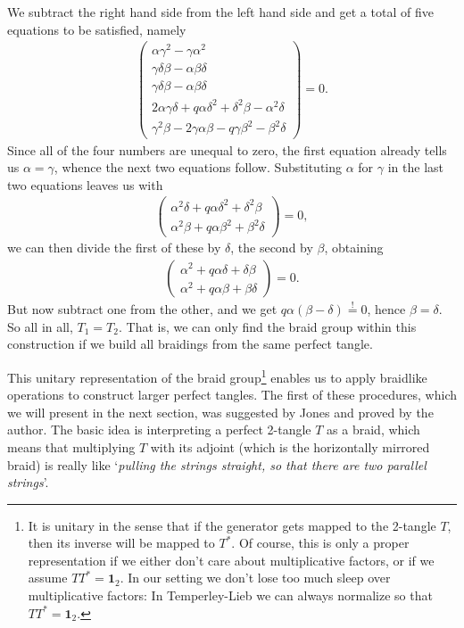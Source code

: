 We subtract the right hand side from the left hand side and get a total of five equations to be satisfied, namely
\begin{align*}
\begin{pmatrix}
\alpha\gamma^2  - \gamma \alpha^2\\
\gamma\delta\beta - \alpha\beta\delta \\
\gamma\delta\beta - \alpha\beta\delta \\
2\alpha\gamma\delta + q\alpha\delta^2 + \delta^2 \beta - \alpha^2\delta\\
\gamma^2\beta - 2\gamma\alpha\beta - q\gamma\beta^2 - \beta^2 \delta
\end{pmatrix} 
=
0.
\end{align*}
Since all of the four numbers are unequal to zero, the first equation already tells us $\alpha = \gamma$, whence the next two equations follow. Substituting $\alpha$ for $\gamma$ in the last two equations leaves us with
\begin{align*}
\begin{pmatrix}
\alpha^2\delta + q\alpha\delta^2 + \delta^2 \beta \\
\alpha^2\beta +q\alpha\beta^2 +\beta^2 \delta
\end{pmatrix}
=0,
\end{align*}
we can then divide the first of these by $\delta$, the second by $\beta$, obtaining
\begin{align*}
\begin{pmatrix}
\alpha^2 + q\alpha\delta + \delta \beta \\
\alpha^2 +q\alpha\beta+\beta \delta
\end{pmatrix}
=0.
\end{align*}
But now subtract one from the other, and we get $q\alpha(\beta - \delta) \overset{!}{=}0$, hence $\beta = \delta$. So all in all, $T_1 = T_2$. That is, we can only find the braid group within this construction if we build all braidings from the same perfect tangle.

This unitary representation of the braid group\footnote{It is unitary in the sense that if the generator gets mapped to the 2-tangle $T$, then its inverse will be mapped to $T^*$. Of course, this is only a proper representation if we either don't care about multiplicative factors, or if we assume $TT^*=\mathbf{1}_2$. In our setting we don't lose too much sleep over multiplicative factors: In Temperley-Lieb we can always normalize so that $TT^* = \mathbf{1}_2$.}
enables us to apply braidlike operations to construct larger perfect tangles. The first of these procedures, which we will present in the next section, was suggested by Jones and proved by the author. The basic idea is interpreting a perfect 2-tangle $T$ as a braid, which means that multiplying $T$ with its adjoint (which is the horizontally mirrored braid) is really like `\emph{pulling the strings straight, so that there are two parallel strings}'.


